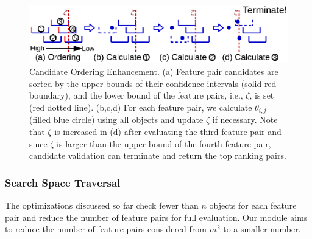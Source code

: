 \begin{figure}[h]
 \centering
 \vspace{-6mm}
 \includegraphics[width=0.9\linewidth]{fig/candidate_ordering.eps}
 \vspace{-5mm}
\caption{Candidate Ordering Enhancement. (a) Feature pair candidates are sorted by the upper bounds of their confidence intervals (solid red boundary), and the lower bound of the \topthree feature pairs, i.e., $\zeta$, is set (red dotted line). (b,c,d) For each feature pair, we calculate $\theta_{i,j}$ (filled blue circle) using all objects and update $\zeta$ if necessary. Note that $\zeta$ is increased in (d) after evaluating the third feature pair and since $\zeta$ is larger than the upper bound of the fourth feature pair, candidate validation can terminate and return the top ranking pairs.}
\vspace{-5mm}
\label{fig:candidate_ordering}
\end{figure}

\subsubsection{Search Space Traversal} \label{ssec:traversal}

The optimizations discussed so far check fewer
than $n$ objects for each feature pair and reduce
the number of feature pairs
for full evaluation. Our \traversal module
aims to reduce the number of feature pairs
considered from $m^2$ to a smaller number.

